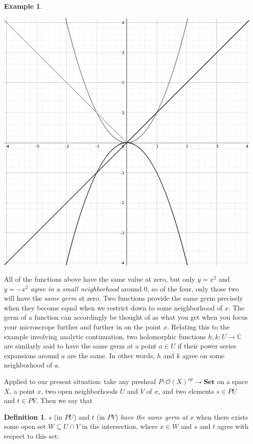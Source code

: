 \documentclass[a4paper]{book}
\theoremstyle{definition}
\newtheorem{example}{Example}[section]
\theoremstyle{definition}
\newtheorem{definition}{Definition}[section]
\theoremstyle{definition}
\theoremstyle{theorem}
\theoremstyle{definition}
\begin{document}
\begin{example}
\begin{center}
		\includegraphics[scale=0.17]{GermsPic.png}
	\end{center} 
	All of the functions above have the same value at zero, but only $y = x^2$ and $y = -x^2$ \textit{agree in a small neighborhood} around 0, so of the four, only those two will have the \textit{same germ} at zero. Two functions provide the same germ precisely when they become equal when we restrict down to some neighborhood of $x$. The germ of a function can accordingly be thought of as what you get when you focus your microscrope further and further in on the point $x$. Relating this to the example involving analytic continuation, two holomorphic functions $h, k: U \rightarrow \mathbb{C}$ are similarly said to have the same germ at a point $a \in U$ if their power series expansions around $a$ are the same. In other words, $h$ and $k$ agree on some neighborhood of $a$. \par 
	Applied to our present situation: take any presheaf $P: \mathscr{O}(X)^{op} \rightarrow \textbf{Set}$ on a space $X$, a point $x$, two open neighborhoods $U$ and $V$ of $x$, and two elements $s \in PU$ and $t \in PV$. Then we say that 
	\begin{definition} 
	$s$ (in $PU$) and $t$ (in $PV$) \textit{have the same germ at} $x$ when there exists some open set $W \subseteq U \cap V$ in the intersection, where $x \in W$ and $s$ and $t$ agree with respect to this set: 

\end{definition}
\end{example}
\end{document}
